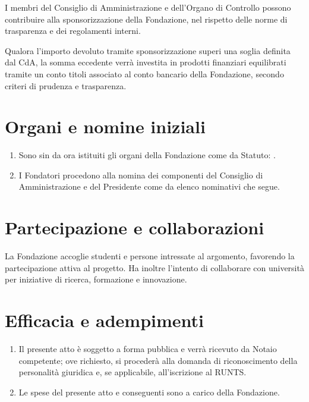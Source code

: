 I membri del Consiglio di Amministrazione e dell'Organo di Controllo possono contribuire alla sponsorizzazione della Fondazione, nel rispetto delle norme di trasparenza e dei regolamenti interni.

Qualora l'importo devoluto tramite sponsorizzazione superi una soglia definita dal CdA, la somma eccedente verrà investita in prodotti finanziari equilibrati tramite un conto titoli associato al conto bancario della Fondazione, secondo criteri di prudenza e trasparenza.

\section*{Organi e nomine iniziali}
\begin{enumerate}[label=\arabic*)]
  \item Sono sin da ora istituiti gli organi della Fondazione come da Statuto: \OrganiElenco.
  \item I Fondatori procedono alla nomina dei componenti del Consiglio di Amministrazione e del Presidente come da elenco nominativi che segue.
\end{enumerate}

\section*{Partecipazione e collaborazioni}
La Fondazione accoglie studenti e persone intressate al argomento, favorendo la partecipazione attiva al progetto. Ha inoltre l’intento di collaborare con università per iniziative di ricerca, formazione e innovazione.

\section*{Efficacia e adempimenti}
\begin{enumerate}[label=\arabic*)]
  \item Il presente atto è soggetto a forma pubblica e verrà ricevuto da Notaio competente; ove richiesto, si procederà alla domanda di riconoscimento della personalità giuridica e, se applicabile, all'iscrizione al RUNTS.
  \item Le spese del presente atto e conseguenti sono a carico della Fondazione.
\end{enumerate}

\DataLuogo{\FondazioneCitta}{\today}



